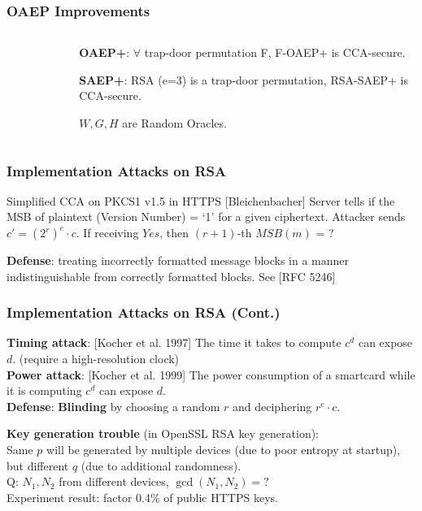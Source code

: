 \begin{frame}\frametitle{OAEP Improvements}
\begin{columns}
\begin{column}{5cm}
\begin{figure}
\begin{center}


\end{center}
\end{figure}
\end{column}
\begin{column}{5cm}
\textbf{OAEP+}: $\forall $ trap-door permutation F, F-OAEP+ is CCA-secure.\newline

\textbf{SAEP+}: RSA (e=3) is a trap-door permutation, RSA-SAEP+ is CCA-secure.\newline

$W, G, H$ are Random Oracles.
\end{column}
\end{columns}
\end{frame}
\begin{frame}\frametitle{Implementation Attacks on RSA}
\begin{exampleblock}{Simplified CCA on PKCS1 v1.5 in HTTPS [Bleichenbacher]}
Server tells if the MSB of plaintext (Version Number) = `1' for a given ciphertext. Attacker sends $c' = (2^{r})^{e}\cdot c$. If receiving $Yes$, then \alert{$(r+1)$-th $MSB(m)$ = ?}
\begin{figure}
\begin{center}

\end{center}
\end{figure}
\end{exampleblock}
\textbf{Defense}: treating incorrectly formatted message blocks in a manner indistinguishable from correctly formatted blocks. See [RFC 5246]
\end{frame}
\begin{frame}\frametitle{Implementation Attacks on RSA (Cont.) }
\textbf{Timing attack}: [Kocher et al. 1997] 
The time it takes to compute $c^d$ can expose $d$. (require a high-resolution clock)\\
\textbf{Power attack}: [Kocher et al. 1999]
The power consumption of a smartcard while it is computing $c^d$ can expose $d$.\\
\textbf{Defense}: \textbf{Blinding} by choosing a random $r$ and deciphering $r^{e}\cdot c$. 
\newline

\textbf{Key generation trouble} (in OpenSSL RSA key generation):\\
Same $p$ will be generated by multiple devices (due to poor entropy at startup), but different $q$ (due to additional randomness).\\
\alert{Q: $N_1,N_2$ from different devices, $\gcd(N_1,N_2) = ?$}\\
Experiment result: factor 0.4\% of public HTTPS keys.
\end{frame}
